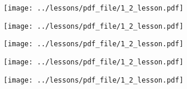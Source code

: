 \documentclass[../main/main.tex]{subfiles}
\begin{document}
\begin{figure}[h!]
\centering
\texttt{[image: ../lessons/pdf\_file/1\_2\_lesson.pdf]}
\end{figure}




\newpage

\begin{figure}[h!]
\centering
\texttt{[image: ../lessons/pdf\_file/1\_2\_lesson.pdf]}
\end{figure}

\begin{figure}[h!]
\centering
\texttt{[image: ../lessons/pdf\_file/1\_2\_lesson.pdf]}
\end{figure}





\newpage

\begin{figure}[h!]
\centering
\texttt{[image: ../lessons/pdf\_file/1\_2\_lesson.pdf]}
\end{figure}

\begin{figure}[h!]
\centering
\texttt{[image: ../lessons/pdf\_file/1\_2\_lesson.pdf]}
\end{figure}

\clearpage
\end{document}
